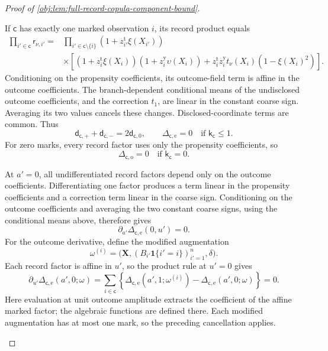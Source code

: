 \begin{proof}[Proof of \cref{obj:lem:full-record-copula-component-bound}]
\begin{enumerate}
If \(\mathsf c\) has exactly one marked observation \(i\), its record product equals
\[
\begin{aligned}
\prod_{i'\in\mathsf c}\mathsf r_{\nu,i'}
={}&
\prod_{i'\in\mathsf c\setminus\{i\}}
 (1+z_{i'}^{\mathrm t}\xi(X_{i'}))\\
&\times
\left[
 (1+z_i^{\mathrm t}\xi(X_i))
 (1+z_i^{\mathrm y}\upsilon(X_i))
 +z_i^{\mathrm t}z_i^{\mathrm y}
   t_\nu(X_i)(1-\xi(X_i)^2)
\right].
\end{aligned}
\]
Conditioning on the propensity coefficients, its outcome-field term is affine in the outcome coefficients. The branch-dependent conditional means of the undisclosed outcome coefficients, and the correction \(t_1\), are linear in the constant coarse sign. Averaging its two values cancels these changes. Disclosed-coordinate terms are common. Thus
\[
\mathsf d_{\mathsf c,+}+\mathsf d_{\mathsf c,-}
 =2\mathsf d_{\mathsf c,0},
\qquad
\Delta_{\mathsf c,\mathrm e}=0
\quad\text{if }\mathsf k_{\mathsf c}\le1.
\]
For zero marks, every record factor uses only the propensity coefficients, so
\[
\Delta_{\mathsf c,\mathrm o}=0
\quad\text{if }\mathsf k_{\mathsf c}=0.
\]

At \(a'=0\), all undifferentiated record factors depend only on the outcome coefficients. Differentiating one factor produces a term linear in the propensity coefficients and a correction term linear in the coarse sign. Conditioning on the outcome coefficients and averaging the two constant coarse signs, using the conditional means above, therefore gives
\[
\partial_{a'}\Delta_{\mathsf c,\mathrm e}(0,u')=0.
\]
For the outcome derivative, define the modified augmentation
\[
\omega^{(i)}
 =\bigl(\mathbf X,(B_{i'}\mathbf1\{i'=i\})_{i'=1}^n,\delta\bigr).
\]
Each record factor is affine in \(u'\), so the product rule at \(u'=0\) gives
\[
\partial_{u'}\Delta_{\mathsf c,\mathrm e}(a',0;\omega)
 =
 \sum_{i\in\mathsf c}
 \left\{
 \Delta_{\mathsf c,\mathrm e}(a',1;\omega^{(i)})
 -\Delta_{\mathsf c,\mathrm e}(a',0;\omega)
 \right\}=0.
\]
Here evaluation at unit outcome amplitude extracts the coefficient of the affine marked factor; the algebraic functions are defined there. Each modified augmentation has at most one mark, so the preceding cancellation applies.


\end{enumerate}
\end{proof}
